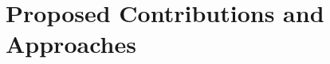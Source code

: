 \documentclass[12pt,vi,oneside,table]{report}
\begin{document}
    \afterpage{\FloatBarrier}


    \chapter{Proposed Contributions and Approaches}
    \label{chap:contributions}

%
%
\end{document}
